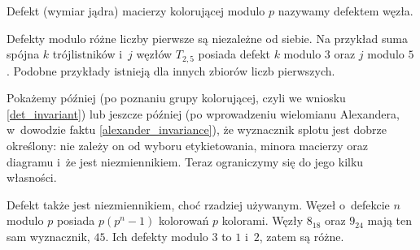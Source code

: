 \begin{definition}[defekt]
    Defekt (wymiar jądra) macierzy kolorującej modulo $p$ nazywamy defektem węzła.
\end{definition}

Defekty modulo różne liczby pierwsze są niezależne od siebie.
Na przykład suma spójna $k$ trójlistników i~$j$ węzłów $T_{2,5}$ posiada defekt $k$ modulo $3$ oraz $j$ modulo $5$.
Podobne przykłady istnieją dla innych zbiorów liczb pierwszych.

Pokażemy później (po poznaniu grupy kolorującej, czyli we wniosku \ref{det_invariant}) lub jeszcze później (po wprowadzeniu wielomianu Alexandera, w~dowodzie faktu \ref{alexander_invariance}), że wyznacznik splotu jest dobrze określony: nie zależy on od wyboru etykietowania, minora macierzy oraz diagramu i~że jest niezmiennikiem.
Teraz ograniczymy się do jego kilku własności.

Defekt także jest niezmiennikiem, choć rzadziej używanym.
Węzeł o~defekcie $n$ modulo $p$ posiada $p(p^n-1)$ kolorowań $p$ kolorami.
Węzły $8_{18}$ oraz $9_{24}$ mają ten sam wyznacznik, $45$.
Ich defekty modulo $3$ to $1$ i~$2$, zatem są różne.




